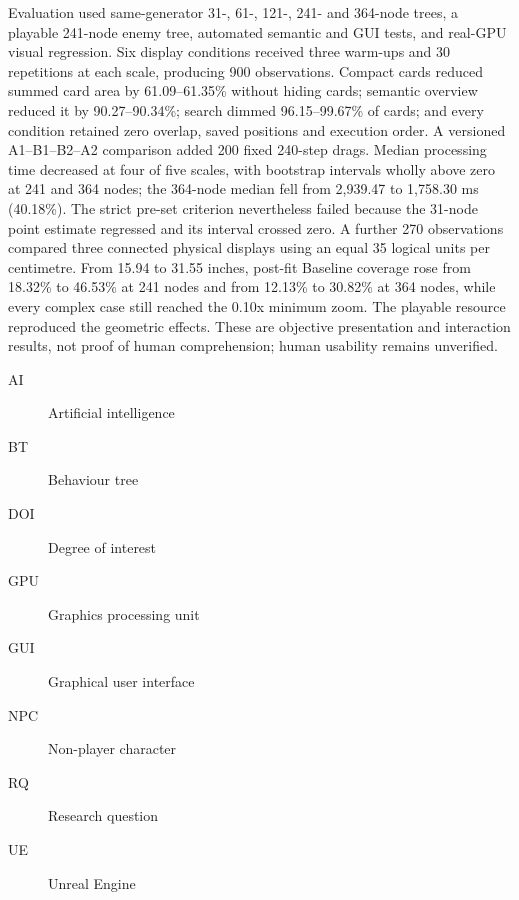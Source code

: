 Evaluation used same-generator 31-, 61-, 121-, 241- and 364-node trees, a playable 241-node enemy tree, automated semantic and GUI tests, and real-\ac{GPU} visual regression. Six display conditions received three warm-ups and 30 repetitions at each scale, producing 900 observations. Compact cards reduced summed card area by 61.09--61.35\% without hiding cards; semantic overview reduced it by 90.27--90.34\%; search dimmed 96.15--99.67\% of cards; and every condition retained zero overlap, saved positions and execution order. A versioned A1--B1--B2--A2 comparison added 200 fixed 240-step drags. Median processing time decreased at four of five scales, with bootstrap intervals wholly above zero at 241 and 364 nodes; the 364-node median fell from 2,939.47 to 1,758.30 ms (40.18\%). The strict pre-set criterion nevertheless failed because the 31-node point estimate regressed and its interval crossed zero. A further 270 observations compared three connected physical displays using an equal 35 logical units per centimetre. From 15.94 to 31.55 inches, post-fit Baseline coverage rose from 18.32\% to 46.53\% at 241 nodes and from 12.13\% to 30.82\% at 364 nodes, while every complex case still reached the 0.10x minimum zoom. The playable resource reproduced the geometric effects. These are objective presentation and interaction results, not proof of human comprehension; human usability remains unverified.

\begin{description}
    \item[AI] Artificial intelligence
    \item[BT] Behaviour tree
    \item[DOI] Degree of interest
    \item[GPU] Graphics processing unit
    \item[GUI] Graphical user interface
    \item[NPC] Non-player character
    \item[RQ] Research question
    \item[UE] Unreal Engine
\end{description}
